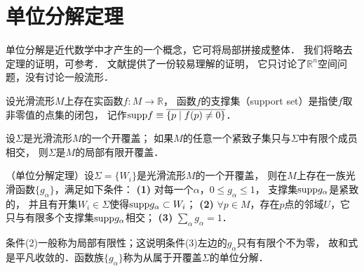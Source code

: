 




\section{单位分解定理}\label{chdf:sec_partition-unity}

单位分解是近代数学中才产生的一个概念，它可将局部拼接成整体．
我们将略去定理的证明，可参考\textcite[\S 3.3]{cc2001-zh}．
文献\parencite[\S 16]{munkres-1997-Analysis}提供了一份较易理解的证明，
它只讨论了$\mathbb{R}^n$空间问题，没有讨论一般流形．


\begin{definition}
    设光滑流形$M$上存在实函数$f:M\to \mathbb{R}$，
    函数$f$的{\heiti 支撑集}（support set）是指使$f$取非零值的点集的闭包，
    记作${\rm supp} f \equiv \overline{\{p\mid f(p)\neq 0 \}}$．
\end{definition}


\begin{definition}
    设$\Sigma$是光滑流形$M$的一个开覆盖；
    如果$M$的任意一个紧致子集只与$\Sigma$中有限个成员相交，
    则$\Sigma$是$M$的{\heiti 局部有限开覆盖}．
\end{definition}


\begin{theorem}\label{chdf:thm_partition-unity}
    （单位分解定理）设$\Sigma=\{W_i\}$是光滑流形$M$的一个开覆盖，
    则在$M$上{\heiti 存在}一族光滑函数$\{g_\alpha\}$，满足如下条件：
    {\bfseries (1)} 对每一个$\alpha$，$0\leqslant g_\alpha \leqslant 1$，
    支撑集${\rm supp}g_\alpha$是紧致的，
    并且有开集$W_i \in \Sigma$使得${\rm supp}g_\alpha \subset W_i$；
    {\bfseries (2)} $\forall p\in M$，存在$p$点的邻域$U$，它只与有限多个支撑集${\rm supp}g_\alpha$相交；
    {\bfseries (3)} $\sum_{\alpha} g_\alpha =1$．
\end{theorem}
条件(2)一般称为{\kaishu 局部有限性}；这说明条件(3)左边的$g_\alpha$只有有限个不为零，
故和式是平凡收敛的．{\kaishu 函数族$\{g_\alpha\}$称为从属于开覆盖$\Sigma$的单位分解}．






